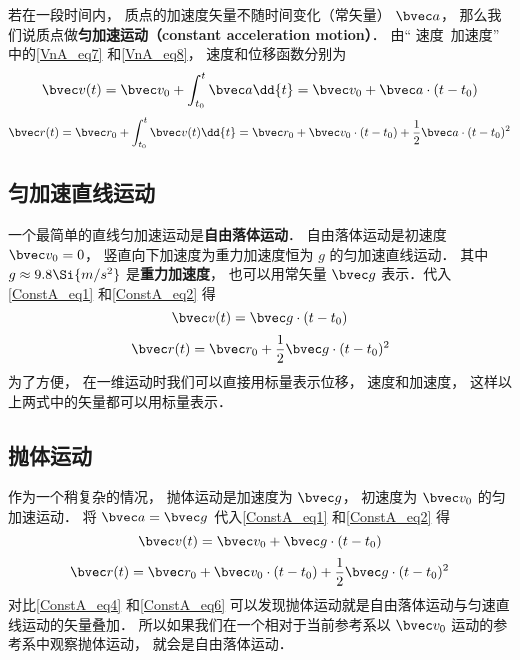 
若在一段时间内， 质点的加速度矢量不随时间变化（常矢量） $\bvec a$， 那么我们说质点做\textbf{匀加速运动（constant acceleration motion）}． 由“ 速度\ 加速度” 中的\autoref{VnA_eq7} 和\autoref{VnA_eq8}， 速度和位移函数分别为
\begin{equation}\label{ConstA_eq1}
\bvec v(t) = \bvec v_0 + \int_{t_0}^{t} \bvec a \dd{t} = \bvec v_0 + \bvec a \cdot (t-t_0)
\end{equation}
\begin{equation}\label{ConstA_eq2}
\bvec r(t) = \bvec r_0 + \int_{t_0}^{t} \bvec v(t) \dd{t} = \bvec r_0 + \bvec v_0\cdot (t-t_0) + \frac12 \bvec a\cdot (t-t_0)^2
\end{equation}


\subsection{匀加速直线运动}
一个最简单的直线匀加速运动是\textbf{自由落体运动}． 自由落体运动是初速度 $\bvec v_0 = 0$， 竖直向下加速度为重力加速度恒为 $g$ 的匀加速直线运动． 其中 $g\approx 9.8\Si{m/s^2}$ 是\textbf{重力加速度}， 也可以用常矢量 $\bvec g$ 表示．代入\autoref{ConstA_eq1} 和\autoref{ConstA_eq2} 得
\begin{equation}\label{ConstA_eq3}
\bvec v(t) = \bvec g \cdot (t-t_0)
\end{equation}
\begin{equation}\label{ConstA_eq4}
\bvec r(t) = \bvec r_0 + \frac12 \bvec g \cdot (t-t_0)^2
\end{equation}
为了方便， 在一维运动时我们可以直接用标量表示位移， 速度和加速度， 这样以上两式中的矢量都可以用标量表示．

\subsection{抛体运动}
作为一个稍复杂的情况， 抛体运动是加速度为 $\bvec g$， 初速度为 $\bvec v_0$ 的匀加速运动． 将 $\bvec a = \bvec g$ 代入\autoref{ConstA_eq1} 和\autoref{ConstA_eq2} 得
\begin{equation}\label{ConstA_eq5}
\bvec v(t) = \bvec v_0 + \bvec g \cdot (t-t_0)
\end{equation}
\begin{equation}\label{ConstA_eq6}
\bvec r(t) = \bvec r_0 + \bvec v_0\cdot (t-t_0) + \frac12 \bvec g\cdot (t-t_0)^2
\end{equation}
对比\autoref{ConstA_eq4} 和\autoref{ConstA_eq6} 可以发现抛体运动就是自由落体运动与匀速直线运动的矢量叠加． 所以如果我们在一个相对于当前参考系以 $\bvec v_0$ 运动的参考系中观察抛体运动， 就会是自由落体运动．

